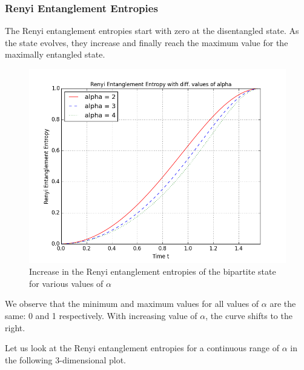 \subsubsection{Renyi Entanglement Entropies}
The Renyi entanglement entropies start with zero at the disentangled state. As the state evolves, they increase and finally reach the maximum value for the maximally entangled state.
\begin{figure}[H]
  \begin{center}
    \includegraphics[scale=0.62]{figures/timeevolution-03.png}
    \caption{Increase in the Renyi entanglement entropies of the bipartite state for various values of $\alpha$}
    \label{fig: Time Evolution: Renyi Entanglement Entropies}
  \end{center}
\end{figure}

We observe that the minimum and maximum values for all values of $\alpha$ are the same: 0 and 1 respectively. With increasing value of $\alpha$, the curve shifts to the right.
\par Let us look at the Renyi entanglement entropies for a continuous range of $\alpha$ in the following 3-dimensional plot.

